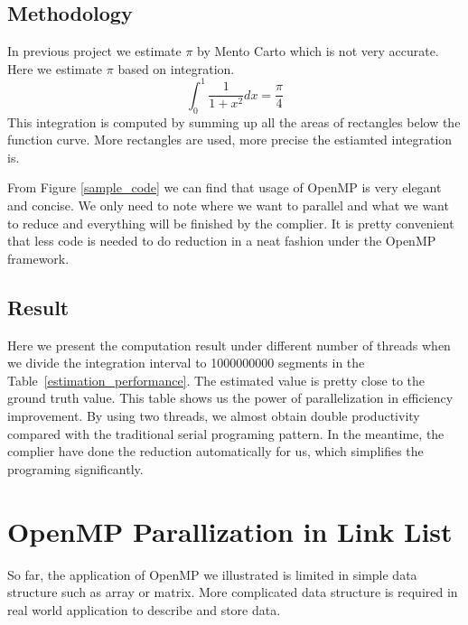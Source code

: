 \documentclass[10pt,twocolumn,letterpaper]{article}
\begin{document}
    \subsection{Methodology}
    In previous project we estimate $\pi$ by Mento Carto which is not very accurate. Here we 
    estimate $\pi$ based on integration. 
    $$\int_0^1 \frac{1}{1 + x^2} dx = \frac{\pi}{4}$$
    This integration is computed by summing up all the areas of rectangles below the function curve.
    More rectangles are used, more precise the estiamted integration is. 
    
    From Figure \ref{sample_code} we can find that usage of OpenMP is
    very elegant and concise. We only need to note where we want to 
    parallel and what we want to reduce and everything will be finished
    by the complier. It is pretty convenient that less code is needed to do reduction in a neat fashion
    under the OpenMP framework. 

    
    \subsection{Result}
    Here we present the computation result under different number of threads when
    we divide the integration interval to 1000000000 segments in the Table~\ref{estimation_performance}.
    The estimated value is pretty close to the ground truth value. This 
    table shows us the power of parallelization in efficiency improvement. By using 
    two threads, we almost obtain double productivity compared with the traditional
    serial programing pattern. In the meantime, the complier have done the reduction
     automatically for us, which simplifies the programing significantly.


    \section{OpenMP Parallization in Link List}
    So far, the application of OpenMP we illustrated is limited in simple data 
    structure such as array or matrix. More complicated data structure is required
    in real world application to describe and store data.
\end{document}
